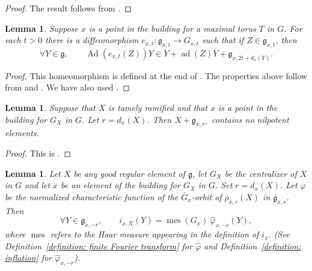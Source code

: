 \documentclass[11pt]{amsart}
\newtheorem{lemma}[theorem]{Lemma}
\theoremstyle{definition}
\theoremstyle{remark}
\numberwithin{equation}{theorem}
\def\GF{{G}}
\def\TF{{T}}
\def\gF{{\mathfrak{g}}}
\def\t{{\mathfrak{t}}}
\newcommand{\Mf}{{\bar\GF}}
\newcommand{\mf}{{\bar\gF}}
\def\vphi{{\varphi}}
\def\hphi{{\hat{\varphi}}}
\def\i{{i}}
\def\Ad{{\rm Ad}}
\def\meas{{\operatorname{mes}}}
\def\ad{{\rm ad}}
\def\Lie{{\operatorname{Lie}}}
\def\Ad{\operatorname{Ad}}
\def\ad{\operatorname{ad}}
\begin{document}
\begin{proof}
The result follows from \cite[2.3.1]{Adler}.
\end{proof}

\begin{lemma}\label{lemma: Adler 2}
Suppose $x$ is a point in the building for a maximal torus $\TF$
in $\GF$. For each $t > 0$ there is a diffeomorphism $e_{x,t} :
\gF_{x,t} \to \GF_{x,t}$ such that if $Z \in \gF_{x,t}$, then
\begin{equation}
    \forall Y\in\gF,\qquad\Ad(e_{x,t}(Z)) Y \in Y + \ad(Z) Y +
    \gF_{x,2t+d_x(Y)}.
\end{equation}
\end{lemma}

\begin{proof}
This homeomorphism is defined at the end of \cite[\S~1.5]{Adler}.
The properties above follow from \cite[1.6.3]{Adler} and
\cite[1.6.4]{Adler}. We have also used \cite[1.6.6]{Adler}.
\end{proof}

\begin{lemma}\label{lemma: Adler 3}
Suppose that $X$ is tamely ramified and that $x$ is a point in the building
for
$\GF_X$ in $\GF$. Let $r = d_x(X)$. Then $X + \gF_{x,r^+}$ contains no
nilpotent
elements.
\end{lemma}

\begin{proof}
This is \cite[1.9.5]{Adler}.
\end{proof}

\begin{lemma}\label{lemma: Gauss integral evaluation on the easy set}
Let $X$ be any good regular element of $\gF$, let $\GF_X$ be the
centralizer of $X$ in $\GF$ and let $x$ be an element of the
building for $\GF_X$ in $\GF$. Set $r=d_x(X)$. Let $\vphi$ be the
normalized characteristic function of the $\Mf_x$-orbit of
$\rho_{x,r}(X)$ in $\mf_{x,r}$. Then
\begin{equation}
    \forall  Y \in \gF_{x,-r},\qquad\i_{x,X}(Y) = \meas(\GF_x)\
    \hphi_{x,-r}(Y),
\end{equation}
where $\meas$ refers to the Haar measure appearing in the
definition of $\i_x$. (See Definition~\ref{definition: finite
Fourier transform} for $\hphi$ and Definition~\ref{definition:
inflation} for $\hphi_{x,-r}$).
\end{lemma}
\end{document}
